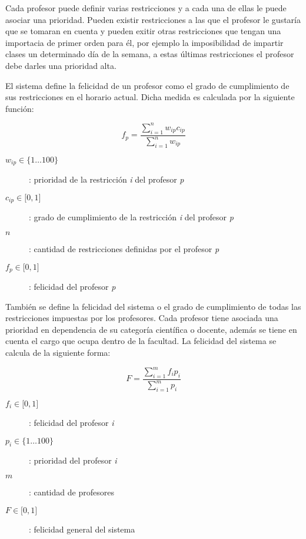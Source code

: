 Cada profesor puede definir varias restricciones y a cada una de ellas le puede asociar una prioridad. Pueden existir restricciones a las que el profesor le gustar\'ia que se tomaran en cuenta y pueden exitir otras restricciones que tengan una importacia de primer orden para \'el, por ejemplo la imposibilidad de impartir clases un determinado d\'ia de la semana, a estas \'ultimas restricciones el profesor debe darles una prioridad alta.

El sistema define la felicidad de un profesor como el grado de cumplimiento de sus restricciones en el horario actual. Dicha medida es calculada por la siguiente funci\'on:

\[ f_{p} = \frac{\sum\limits_{i=1}^n w_{ip} c_{ip}}{\sum\limits_{i=1}^n w_{ip}} \]

\begin{description}

\item[$w_{ip} \in \{1 \ldots 100\}$]: prioridad de la restricci\'on \emph{i} del profesor \emph{p}
\item[$c_{ip} \in \lbrack 0,1 \rbrack$]: grado de cumplimiento de la restricci\'on \emph{i} del profesor \emph{p}
\item[$n$]: cantidad de restricciones definidas por el profesor \emph{p}
\item[$f_{p} \in \lbrack 0,1 \rbrack$]: felicidad del profesor \emph{p}

\end{description}

Tambi\'en se define la felicidad del sistema o el grado de cumplimiento de todas las restricciones impuestas por los profesores. Cada profesor tiene asociada una prioridad en dependencia de su categor\'ia cient\'ifica o docente, adem\'as se tiene en cuenta el cargo que ocupa dentro de la facultad. La felicidad del sistema se calcula de la siguiente forma:

\[ F = \frac{\sum\limits_{i=1}^m f_{i} p_{i}}{\sum\limits_{i=1}^m p_{i}} \]

\begin{description}

\item[$f_{i} \in \lbrack 0,1 \rbrack$]: felicidad del profesor \emph{i}
\item[$p_{i} \in \{1 \ldots 100\}$]: prioridad del profesor \emph{i}
\item[$m$]: cantidad de profesores
\item[$F \in \lbrack 0,1 \rbrack$]: felicidad general del sistema

\end{description}

